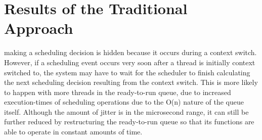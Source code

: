 \section{Results of the Traditional Approach}
making a scheduling decision is hidden because it occurs during a context
switch.  However, if a scheduling event occurs very soon after a thread is
initially context switched to, the system may have to wait for the scheduler to
finish calculating the next scheduling decision resulting from the context
switch.  This is more likely to happen with more threads in the ready-to-run
queue, due to increased execution-times of scheduling operations due to the
O(n) nature of the queue itself.  Although the amount of jitter is in the
microsecond range, it can still be further reduced by restructuring the
ready-to-run queue so that its functions are able to operate in constant
amounts of time.
